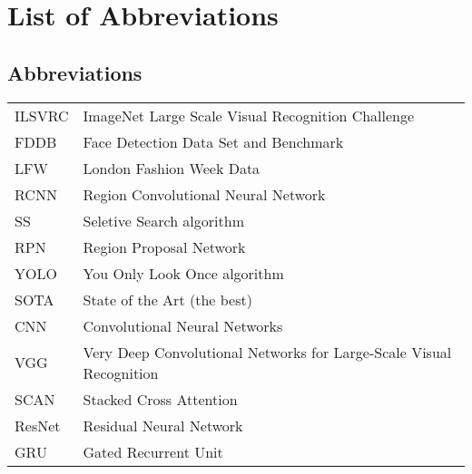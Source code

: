 \documentclass[master=mai,masteroption=bda]{kulemt}
\begin{document}
\listoffiguresandtables
\chapter{List of Abbreviations}
\section*{Abbreviations}
\begin{flushleft}
  \renewcommand{\arraystretch}{1.1}
  \begin{tabularx}{\textwidth}{@{}p{12mm}X@{}}
    ILSVRC & ImageNet Large Scale Visual Recognition Challenge \\
    FDDB   & Face Detection Data Set and Benchmark \\
    LFW   & London Fashion Week Data \\
    RCNN  & Region Convolutional Neural Network \\
    SS   & Seletive Search algorithm \\
    RPN & Region Proposal Network \\
    YOLO & You Only Look Once algorithm \\
    SOTA & State of the Art (the best) \\
    CNN & Convolutional Neural Networks \\
    VGG & Very Deep Convolutional Networks for Large-Scale Visual Recognition \\
    SCAN & Stacked Cross Attention \\
    ResNet & Residual Neural Network \\
    GRU & Gated Recurrent Unit
  \end{tabularx}
\end{flushleft}
\end{document}
